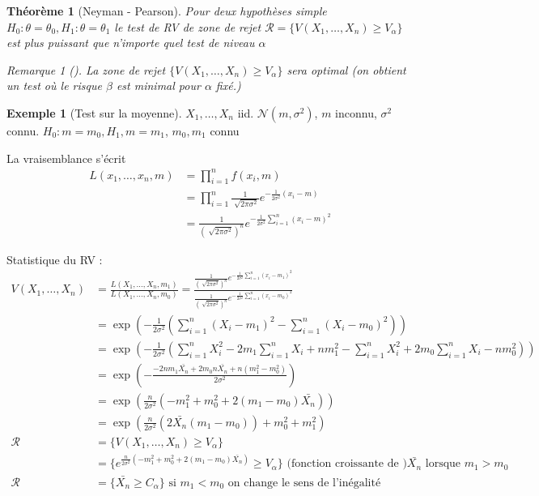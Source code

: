 \documentclass{article}
\theoremstyle{plain}%
\newtheorem{thm}{Théorème}[section]
\theoremstyle{definition}
\newtheorem{exmp}{Exemple}[section]
\theoremstyle{remark}
\newtheorem*{rem}{Remarque}
\begin{document}
\begin{thm}[Neyman - Pearson]
    Pour deux hypothèses simple $ H_0: \theta = \theta _0, H_1: \theta = \theta _1 $ le test de RV de zone de rejet $ \mathcal{R} = \{V(X_1, \dots, X_n) \geq V_\alpha \}$ est plus puissant que n'importe quel test de niveau $ \alpha  $ 

    \begin{rem}[]
        La zone de rejet $ \{V(X_1, \dots, X_n) \geq V_\alpha \} $ sera optimal (on obtient un test où le risque $ \beta $ est minimal pour $ \alpha $ fixé.)
    \end{rem}
\end{thm}

\begin{exmp}[Test sur la moyenne]
    $ X_1, \dots, X_n $ iid. $ \mathcal{N}(m, \sigma ^2) $, $ m $ inconnu, $ \sigma ^2 $ connu.  $ H_0: m=m_0, H_1, m=m_1 $, $ m_0, m_1 $ connu

    La vraisemblance s'écrit 
    \begin{align*}
        L(x_1, \dots, x_n, m) &= \prod_{i=1}^{n}f(x_i, m) \\
            &= \prod_{i=1}^{n}\frac{1}{\sqrt[]{2 \pi \sigma ^2}} e^{- \frac{1}{2 \sigma ^2} (x_i - m)} \\
            &= \frac{1}{(\sqrt[]{2 \pi \sigma^2})^n} e^{- \frac{1}{2 \sigma ^2} \sum_{i=1}^{n}(x_i - m)^2}
    \end{align*}

    Statistique du RV : 
    \begin{align*}
        V(X_1, \dots, X_n) &= \frac{L(X_1,\dots, X_n, m_1)}{L(X_1,\dots, X_n, m_0)} = \frac{\frac{1}{(\sqrt[]{2 \pi \sigma^2})^n} e^{- \frac{1}{2 \sigma ^2} \sum_{i=1}^{n}(x_i - m_1)^2}}{\frac{1}{(\sqrt[]{2 \pi \sigma^2})^n} e^{- \frac{1}{2 \sigma ^2} \sum_{i=1}^{n}(x_i - m_0)^2}} \\
            &= \exp (- \frac{1}{2 \sigma ^2} (\sum_{i=1}^{n} (X_i - m_1)^2 - \sum_{i=1}^{n}(X_i - m_0)^2 )) \\
            &= \exp (- \frac{1}{2 \sigma ^2} ( \sum_{i=1}^{n}X_i^2 - 2m_1 \sum_{i=1}^{n}X_i + nm_1^2 - \sum_{i=1}^{n}X_i^2 + 2m_0 \sum_{i=1}^{n}X_i - nm_0^2)) \\
            &= \exp (- \frac{-2nm_1 \bar{X_n} + 2m_0 n \bar{X_n} + n(m_1^2 - m_0^2)}{2 \sigma ^2}) \\
            &= \exp ( \frac{n}{2 \sigma ^2} ( -m_1^2 + m_0^2 + 2(m_1 - m_0) \bar{X_n})) \\
            &= \exp ( \frac{n}{2 \sigma ^2} (2\bar{X_n}(m_1 - m_0) )+ m_0^2 + m_1^2) \\
        \mathcal{R} &= \{V(X_1, \dots, X_n) \geq V_\alpha \} \\
            &= \{e^{\frac{n}{2 \sigma ^2} (-m_1^2 + m_0^2 + 2(m_1 - m_0) \bar{X_n})} \geq V_\alpha \} \text{ (fonction croissante de )} \bar{X_n} \text{ lorsque } m_1 > m_0 \\
        \mathcal{R} &= \{\bar{X_n} \geq C_\alpha \} \text{ si } m_1<m_0 \text{ on change le sens de l'inégalité}
    \end{align*}


\end{exmp}
\end{document}

